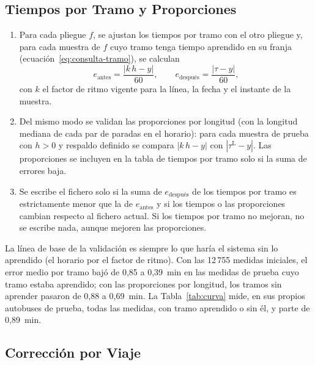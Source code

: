 \subsection{Tiempos por Tramo y Proporciones}

\begin{enumerate}
  \item Para cada pliegue $f$, se ajustan los tiempos por tramo con el otro pliegue y, para cada muestra de $f$ cuyo
        tramo tenga tiempo aprendido en su franja (ecuación~\eqref{eq:consulta-tramo}), se calculan
        \[
        e_{\mathrm{antes}}=\frac{|k\,h-y|}{60},\qquad e_{\text{después}}=\frac{|\tau-y|}{60},
        \]
        con $k$ el factor de ritmo vigente para la línea, la fecha y el instante de la muestra.
  \item Del mismo modo se validan las proporciones por longitud (con la longitud mediana de cada par de paradas en el
        horario): para cada muestra de prueba con $h>0$ y respaldo definido se compara $|k\,h-y|$ con
        $|\tau^{\mathrm{L}}-y|$. Las proporciones se incluyen en la tabla de tiempos por tramo solo si la suma de
        errores baja.
  \item Se escribe el fichero solo si la suma de $e_{\text{después}}$ de los tiempos por tramo es estrictamente
        menor que la de $e_{\mathrm{antes}}$ y si los tiempos o las proporciones cambian respecto al fichero actual. Si
        los tiempos por tramo no mejoran, no se escribe nada, aunque mejoren las proporciones.
\end{enumerate}

\noindent La línea de base de la validación es siempre lo que haría el sistema sin lo aprendido (el horario por el
factor de ritmo). Con las 12\,755 medidas iniciales, el error medio por tramo bajó de 0,85 a 0,39~min en las
medidas de prueba cuyo tramo estaba aprendido; con las proporciones por longitud, los tramos sin aprender pasaron de
0,88 a 0,69~min. La Tabla~\ref{tab:curva} mide, en sus propios autobuses de prueba, todas las medidas, con tramo aprendido o
sin él, y parte de 0,89~min.

\subsection{Corrección por Viaje}

